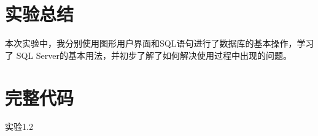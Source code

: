 \documentclass[a4paper,twoside]{article}
\begin{document}
\begin{spacing}{1.2}
\clearpage

\section{实验总结}

本次实验中，我分别使用图形用户界面和SQL语句进行了数据库的基本操作，学习了
SQL Server的基本用法，并初步了解了如何解决使用过程中出现的问题。

\appendix

\clearpage

\section{完整代码}

\begin{listing}[H]
	\caption{实验1.2}
	\label{code:full}
    \inputminted{sql}{../code/1.2.sql}
\end{listing}


\end{spacing}
\end{document}
